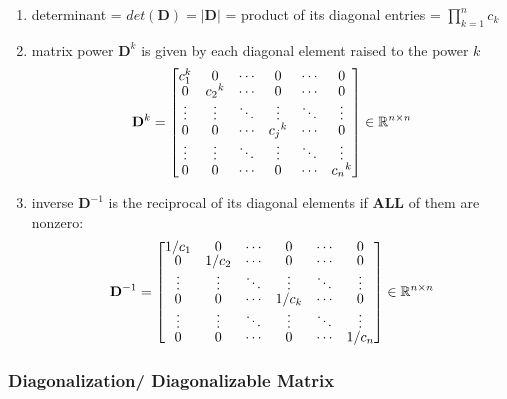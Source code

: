 \begin{enumerate}
    \item determinant = $det(\mathbf{D}) = |\mathbf{D}|$ = product of its diagonal entries = $\displaystyle \prod_{k=1}^{n} c_k$

    \item matrix power $\mathbf{D}^k$ is given by each diagonal element raised to the power $k$
    \[
        \displaystyle
        \renewcommand{\arraystretch}{0.6}
        \mathbf{D}^{k} = \begin{bmatrix}
            c_1^k & 0 & \cdots & 0 & \cdots & 0 \\
            0 & {c_2}^k & \cdots & 0 & \cdots & 0 \\
            \vdots & \vdots & \ddots & \vdots & \ddots & \vdots \\
            0 & 0 & \cdots & {c_j}^k & \cdots & 0 \\
            \vdots & \vdots & \ddots & \vdots & \ddots & \vdots \\
            0 & 0 & \cdots & 0 & \cdots & {c_n}^k \\
        \end{bmatrix} \in \mathbb{R}^{n\times n}
    \]

    \item inverse $\mathbf{D}^{-1}$ is the reciprocal of its diagonal elements if \textbf{ALL} of them are nonzero:
    \[
        \displaystyle
        \renewcommand{\arraystretch}{0.6}
        \mathbf{D}^{-1} = \begin{bmatrix}
            {1}/{c_1} & 0 & \cdots & 0 & \cdots & 0 \\
            0 & {1}/{c_2} & \cdots & 0 & \cdots & 0 \\
            \vdots & \vdots & \ddots & \vdots & \ddots & \vdots \\
            0 & 0 & \cdots & {1}/{c_k} & \cdots & 0 \\
            \vdots & \vdots & \ddots & \vdots & \ddots & \vdots \\
            0 & 0 & \cdots & 0 & \cdots & {1}/{c_n} \\
        \end{bmatrix} \in \mathbb{R}^{n\times n}
    \]  
\end{enumerate}


\subsubsection{Diagonalization/ Diagonalizable Matrix \cite{mfml-1}} \label{Diagonalization/ Diagonalizable Matrix}

